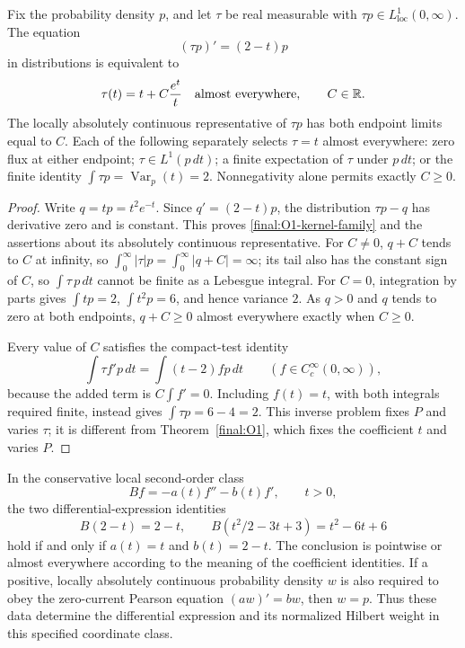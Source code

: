 \begin{proposition}
\label{final:O1-kernel}
Fix the probability density $p$, and let $\tau$ be real measurable with
$\tau p\in L^1_{\mathrm{loc}}(0,\infty)$.  The equation
\[
 (\tau p)'=(2-t)p
\]
in distributions is equivalent to
\begin{equation}\label{final:O1-kernel-family}
 \tau(t)=t+C\frac{e^t}{t}\quad\hbox{almost everywhere},
 \qquad C\in\mathbb R.
\end{equation}
The locally absolutely continuous representative of $\tau p$ has both
endpoint limits equal to $C$.  Each of the following separately selects
$\tau=t$ almost everywhere: zero flux at either endpoint;
$\tau\in L^1(p\,dt)$; a finite expectation of $\tau$ under $p\,dt$; or
the finite identity $\int\tau p=\operatorname{Var}_p(t)=2$.
Nonnegativity alone permits exactly $C\geq0$.
\end{proposition}

\begin{proof}
Write $q=tp=t^2e^{-t}$.  Since $q'=(2-t)p$, the distribution
$\tau p-q$ has derivative zero and is constant.  This proves
\eqref{final:O1-kernel-family} and the assertions about its absolutely
continuous representative.  For $C\ne0$, $q+C$ tends to $C$ at infinity,
so $\int_0^\infty|\tau|p=\int_0^\infty|q+C|=\infty$; its tail also
has the constant sign of $C$, so $\int \tau\,p\,dt$ cannot be finite as
a Lebesgue integral.  For $C=0$, integration by parts gives
$\int tp=2$, $\int t^2p=6$, and hence variance $2$.
As $q>0$ and $q$ tends to zero at both endpoints, $q+C\geq0$
almost everywhere exactly when $C\geq0$.

Every value of $C$ satisfies the compact-test identity
\[
 \int\tau f'p\,dt=\int(t-2)fp\,dt
 \qquad(f\in C_c^\infty(0,\infty)),
\]
because the added term is $C\int f'=0$.  Including $f(t)=t$, with
both integrals required finite, instead gives $\int\tau p=6-4=2$.
This inverse problem fixes $P$ and varies $\tau$; it is different from
Theorem~\ref{final:O1}, which fixes the coefficient $t$ and varies $P$.
\end{proof}

\begin{theorem}
\label{final:O2}
In the conservative local second-order class
\[
 Bf=-a(t)f''-b(t)f',\qquad t>0,
\]
the two differential-expression identities
\begin{equation}\label{final:O2-probes}
 B(2-t)=2-t,\qquad
 B(t^2/2-3t+3)=t^2-6t+6
\end{equation}
hold if and only if $a(t)=t$ and $b(t)=2-t$.
The conclusion is pointwise or almost everywhere according to the
meaning of the coefficient identities.  If a positive, locally
absolutely continuous probability density $w$ is also required to obey
the zero-current Pearson equation $(aw)'=bw$, then $w=p$.
Thus these data determine the differential expression and its normalized
Hilbert weight in this specified coordinate class.
\end{theorem}

